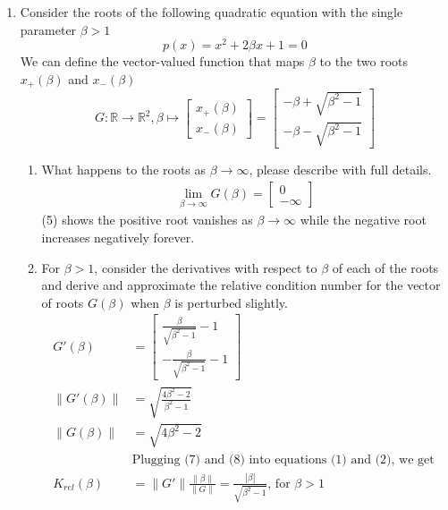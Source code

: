 \documentclass[10pt]{article}
\newcommand{\norm}[1]{\lVert#1\rVert}
\begin{document}
\begin{enumerate}
\item Consider the roots of the following quadratic equation with the single parameter $\beta > 1$
	\begin{equation*}
		p(x) = x^2 + 2\beta x + 1 = 0
	\end{equation*}
	We can define the vector-valued function that maps $\beta$ to the two roots $x_{+}(\beta)$ and $x_{-}(\beta)$
	\begin{equation*}
		G : \mathbb{R} \rightarrow \mathbb{R}^2, \beta \mapsto \begin{bmatrix} x_{+}(\beta) \\ x_{-}(\beta)  \end{bmatrix} = \begin{bmatrix} -\beta + \sqrt{\beta^2 - 1} \\ -\beta -\sqrt{\beta^2 -1}\end{bmatrix}
	\end{equation*}
	\begin{enumerate}[label=(\alph*)]
		\item What happens to the roots as $\beta \rightarrow \infty$, please describe with full details.
			\begin{align}
				\lim_{\beta \rightarrow \infty} G(\beta) = \begin{bmatrix} 0 \\ -\infty \end{bmatrix}
			\end{align}
			(5) shows the positive root vanishes as $\beta \to \infty$ while the negative root increases negatively forever.
		\item For $\beta > 1$, consider the derivatives with respect to $\beta$ of each of the roots and derive and approximate the relative condition number for the vector of roots $G(\beta)$ when $\beta$ is perturbed slightly.
			\begin{align}
				G'(\beta) &= \begin{bmatrix} \frac{\beta}{\sqrt{\beta^2-1}} - 1 \\ -\frac{\beta}{\sqrt{\beta^2-1}} - 1 \end{bmatrix} \\ 
				\norm{G'(\beta)} &= \sqrt{\frac{4\beta^2-2}{\beta^2-1}} \\
				\norm{G(\beta)} &= \sqrt{4\beta^2-2}\\
				&\mbox{Plugging (7) and (8) into equations (1) and (2), we get } \nonumber \\
				K_{rel}(\beta) &= \norm{G'}\frac{\norm{\beta}}{\norm{G}}  = \frac{|\beta|}{\sqrt{\beta^2 - 1}} \mbox{, for $\beta > 1$}

\end{align}
\end{enumerate}
\end{enumerate}
\end{document}
